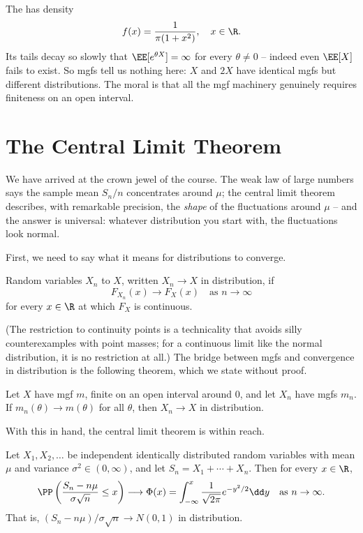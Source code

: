 \begin{example}
	The  has density
	$$
	f(x) = \frac{1}{\pi(1 + x^2)}, \quad x \in \R.
	$$
	Its tails decay so slowly that $\EE[e^{\theta X}] = \infty$ for every $\theta \neq 0$ -- indeed even $\EE[X]$ fails to exist. So mgfs tell us nothing here: $X$ and $2X$ have identical mgfs but different distributions. The moral is that all the mgf machinery genuinely requires finiteness on an open interval.
\end{example}

\section{The Central Limit Theorem}

We have arrived at the crown jewel of the course. The weak law of large numbers says the sample mean $S_n / n$ concentrates around $\mu$; the central limit theorem describes, with remarkable precision, the \emph{shape} of the fluctuations around $\mu$ -- and the answer is universal: whatever distribution you start with, the fluctuations look normal.

First, we need to say what it means for distributions to converge.

\begin{definition}
	Random variables $X_n$  to $X$, written $X_n \rightarrow X$ in distribution, if
	$$
	F_{X_n}(x) \longrightarrow F_X(x) \quad \text{as } n \rightarrow \infty
	$$
	for every $x \in \R$ at which $F_X$ is continuous.
\end{definition}

(The restriction to continuity points is a technicality that avoids silly counterexamples with point masses; for a continuous limit like the normal distribution, it is no restriction at all.) The bridge between mgfs and convergence in distribution is the following theorem, which we state without proof.

\begin{theorem}
	Let $X$ have mgf $m$, finite on an open interval around $0$, and let $X_n$ have mgfs $m_n$. If $m_n(\theta) \rightarrow m(\theta)$ for all $\theta$, then $X_n \rightarrow X$ in distribution.
\end{theorem}

With this in hand, the central limit theorem is within reach.

\begin{theorem}
	Let $X_1, X_2, \dots$ be independent identically distributed random variables with mean $\mu$ and variance $\sigma^2 \in (0, \infty)$, and let $S_n = X_1 + \cdots + X_n$. Then for every $x \in \R$,
	$$
	\PP\left(\frac{S_n - n\mu}{\sigma\sqrt{n}} \leq x \right) \longrightarrow \Phi(x) = \int_{-\infty}^{x} \frac{1}{\sqrt{2\pi}}e^{-y^2/2}\dd y \quad \text{as } n \rightarrow \infty.
	$$
	That is, $(S_n - n\mu)/\sigma\sqrt{n} \rightarrow N(0,1)$ in distribution.
\end{theorem}

